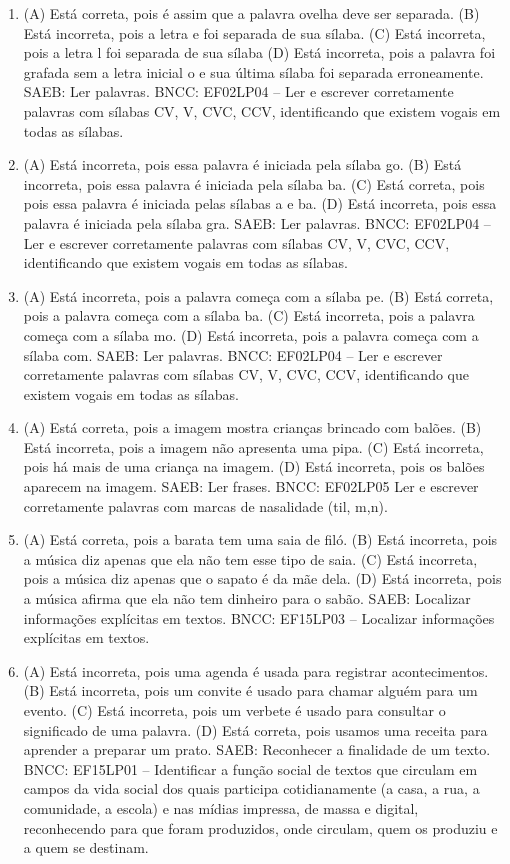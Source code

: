 \begin{enumerate}
\item
(A) Está correta, pois é assim que a palavra ovelha deve ser separada.
(B) Está incorreta, pois a letra e foi separada de sua sílaba.
(C) Está incorreta, pois a letra l foi separada de sua sílaba
(D) Está incorreta, pois a palavra foi grafada sem a letra inicial o e sua última sílaba foi separada erroneamente.
SAEB: Ler palavras.
BNCC: EF02LP04 -- Ler e escrever corretamente palavras com sílabas
CV, V, CVC, CCV, identificando que existem vogais em todas as sílabas.

\item
(A) Está incorreta, pois essa palavra é iniciada pela sílaba go.
(B) Está incorreta, pois essa palavra é iniciada pela sílaba ba.
(C) Está correta, pois pois essa palavra é iniciada pelas sílabas a e ba.
(D) Está incorreta, pois essa palavra é iniciada pela sílaba gra.
SAEB: Ler palavras.
BNCC: EF02LP04 -- Ler e escrever corretamente palavras com
sílabas CV, V, CVC, CCV, identificando que existem vogais em todas as
sílabas.

\item
(A) Está incorreta, pois a palavra começa com a sílaba pe.
(B) Está correta, pois a palavra começa com a sílaba ba.
(C) Está incorreta, pois a palavra começa com a sílaba mo.
(D) Está incorreta, pois a palavra começa com a sílaba com.
SAEB: Ler palavras.
BNCC: EF02LP04 -- Ler e escrever corretamente palavras com sílabas CV, V, CVC, CCV, identificando que existem vogais em todas as sílabas.

\item
(A) Está correta, pois a imagem mostra crianças brincado com balões.
(B) Está incorreta, pois a imagem não apresenta uma pipa.
(C) Está incorreta, pois há mais de uma criança na imagem.
(D) Está incorreta, pois os balões aparecem na imagem.
SAEB: Ler frases.
BNCC: EF02LP05 Ler e escrever corretamente palavras com marcas
de nasalidade (til, m,n).

\item
(A) Está correta, pois a barata tem uma saia de filó.
(B) Está incorreta, pois a música diz apenas que ela não tem esse tipo de saia.
(C) Está incorreta, pois a música diz apenas que o sapato é da mãe dela.
(D) Está incorreta, pois a música afirma que ela não tem dinheiro para o sabão.
SAEB: Localizar informações explícitas em textos.
BNCC: EF15LP03 -- Localizar informações explícitas em textos.

\item
(A) Está incorreta, pois uma agenda é usada para registrar acontecimentos.
(B) Está incorreta, pois um convite é usado para chamar alguém para um evento.
(C) Está incorreta, pois um verbete é usado para consultar o significado de uma palavra.
(D) Está correta, pois usamos uma receita para aprender a preparar um prato.
SAEB: Reconhecer a finalidade de um texto.
BNCC: EF15LP01 -- Identificar a função social de textos que circulam em
campos da vida social dos quais participa cotidianamente (a casa, a rua,
a comunidade, a escola) e nas mídias impressa, de massa e digital,
reconhecendo para que foram produzidos, onde circulam, quem os produziu
e a quem se destinam.


\end{enumerate}
